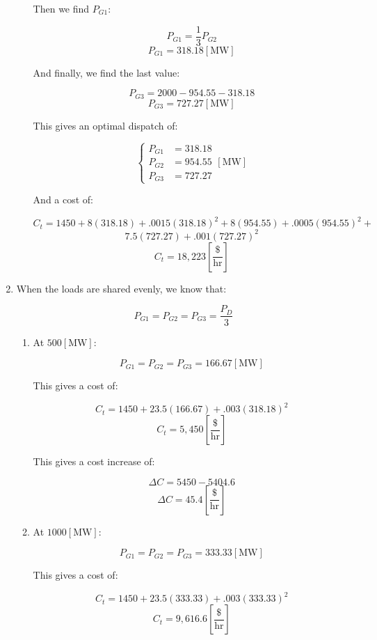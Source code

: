 \begin{enumerate}
\begin{enumerate}
        Then we find $P_{G1}$:

        $$P_{G1}=\frac{1}{3}P_{G2}$$
        $$\boxed{P_{G1}=318.18[\si{\mega\watt}]}$$

        And finally, we find the last value:

        $$P_{G3}=2000-954.55-318.18$$
        $$\boxed{P_{G3}=727.27[\si{\mega\watt}]}$$

        This gives an optimal dispatch of:

        $$\boxed{\left\{\begin{array}{ll} P_{G1}&= 318.18\\P_{G2}&= 954.55\\P_{G3}&= 727.27\end{array}[\si{\mega\watt}]}$$

        And a cost of:

        $$C_t=1450+8(318.18)+.0015(318.18)^2+8(954.55)+.0005(954.55)^2+$$
        $$7.5(727.27)+.001(727.27)^2$$
        $$\boxed{C_t=18,223\left[ \frac{\$}{\text{hr}} \right]}$$

    \end{enumerate}

  \item When the loads are shared evenly, we know that:

    $$P_{G1}=P_{G2}=P_{G3}=\frac{P_D}{3}$$

    \begin{enumerate}

      \item At $500[\si{\mega\watt}]$:

        $$P_{G1}=P_{G2}=P_{G3}=166.67[\si{\mega\watt}]$$

        This gives a cost of:

        $$C_t=1450+23.5(166.67)+.003(318.18)^2$$
        $$\boxed{C_t=5,450\left[ \frac{\$}{\text{hr}} \right]}$$

        This gives a cost increase of:

        $$\Delta C=5450-5404.6$$
        $$\boxed{\Delta C=45.4\left[ \frac{\$}{\text{hr}} \right]}$$

      \item At $1000[\si{\mega\watt}]$:

        $$P_{G1}=P_{G2}=P_{G3}=333.33[\si{\mega\watt}]$$

        This gives a cost of:

        $$C_t=1450+23.5(333.33)+.003(333.33)^2$$
        $$\boxed{C_t=9,616.6\left[ \frac{\$}{\text{hr}} \right]}$$


\end{enumerate}
\end{enumerate}
